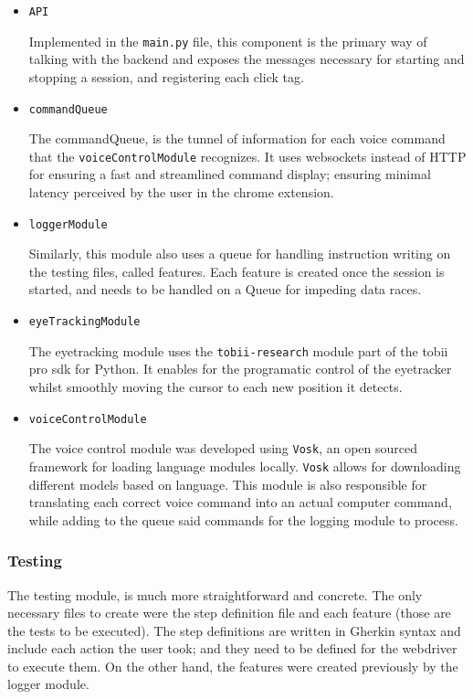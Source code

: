\begin{itemize}
    \item \verb|API|
    
    Implemented in the \verb|main.py| file, this component is the primary way of talking with the backend and exposes the messages necessary for starting and stopping a session, and registering each click tag. 
    
    \item \verb|commandQueue|
    
    The commandQueue, is the tunnel of information for each voice command that the \verb|voiceControlModule| recognizes. It uses websockets instead of HTTP for ensuring a fast and streamlined command display; ensuring minimal latency perceived by the user in the chrome extension. 

    \item \verb|loggerModule|
    
    Similarly, this module also uses a queue for handling instruction writing on the testing files, called features. Each feature is created once the session is started, and needs to be handled on a Queue for impeding data races. 
    
    \item \verb|eyeTrackingModule|
    
    The eyetracking module uses the \verb|tobii-research| module part of the tobii pro sdk for Python. It enables for the programatic control of the eyetracker whilst smoothly moving the cursor to each new position it detects. 
    
    \item \verb|voiceControlModule|
    
    The voice control module was developed using \verb|Vosk|, an open sourced framework for loading language modules locally. \verb|Vosk| allows for downloading different models based on language. This module is also responsible for translating each correct voice command into an actual computer command, while adding to the queue said commands for the logging module to process.
    
\end{itemize}

\subsubsection{Testing}

The testing module, is much more straightforward and concrete. The only necessary files to create were the step definition file and each feature (those are the tests to be executed). The step definitions are written in Gherkin syntax and include each action the user took; and they need to be defined for the webdriver to execute them. On the other hand, the features were created previously by the logger module.



